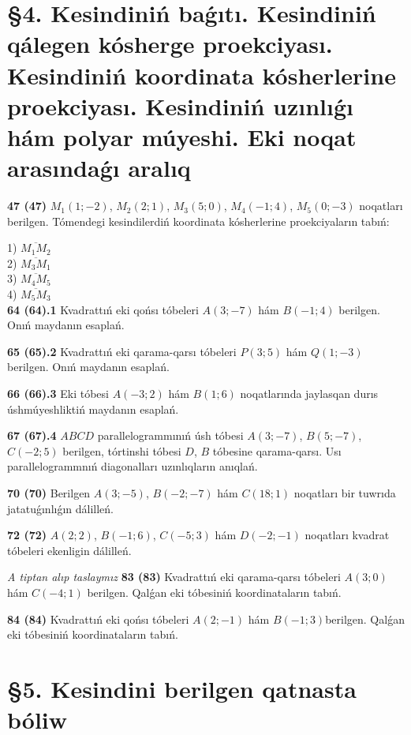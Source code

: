 \documentclass{article}
\begin{document}

\section*{\S 4. Kesindiniń baǵıtı. Kesindiniń qálegen kósherge proekciyası. 
Kesindiniń koordinata kósherlerine proekciyası. 
Kesindiniń uzınlıǵı hám polyar múyeshi. 
Eki noqat arasındaǵı aralıq}

\textbf{47 (47)} $M_1(1; -2)$, $M_2(2; 1)$, $M_3(5; 0)$, 
$M_4(-1; 4)$, $M_5(0; -3)$ noqatları berilgen. 
Tómendegi kesindilerdiń koordinata kósherlerine proekciyaların tabıń:

1) $\overline{M_1M_2}$ \\
2) $\overline{M_3M_1}$ \\
3) $\overline{M_4M_5}$ \\
4) $\overline{M_5M_3}$ \\

\textbf{64 (64).1} Kvadrattıń eki qońsı tóbeleri $A(3; -7)$ hám
$B(-1;4)$ berilgen. Onıń maydanın esaplań.

\textbf{65 (65).2} Kvadrattıń eki qarama-qarsı tóbeleri $P(3; 5)$ hám
$Q(1; -3)$ berilgen. Onıń maydanın esaplań.

\textbf{66 (66).3} Eki tóbesi $A(-3; 2)$ hám $B(1; 6)$ noqatlarında
jaylasqan durıs úshmúyeshliktiń maydanın esaplań.

\textbf{67 (67).4} $ABCD$ parallelogrammınıń úsh tóbesi $A(3; -7)$, 
$B(5; -7)$, $C(-2; 5)$ berilgen, tórtinshi tóbesi $D$, 
$B$ tóbesine qarama-qarsı. Usı parallelogrammnıń diagonalları
uzınlıqların anıqlań.

\textbf{70 (70)} Berilgen $A(3; -5)$, $B(-2; -7)$ hám
$C(18; 1)$ noqatları bir tuwrıda jatatuǵınlıǵın dálilleń.

\textbf{72 (72)} $A(2;2)$, $B(-1;6)$, $C(-5;3)$ hám $D(-2;-1)$
noqatları kvadrat tóbeleri ekenligin dálilleń.

\emph{A tiptan alıp taslaymız}
\textbf{83 (83)} Kvadrattıń eki qarama-qarsı tóbeleri $A(3;0)$ hám
$C(-4;1)$ berilgen. Qalǵan eki tóbesiniń koordinataların tabıń.

\textbf{84 (84)} Kvadrattıń eki qońsı tóbeleri $A(2;-1)$ hám
$B(-1;3)$berilgen. Qalǵan eki tóbesiniń koordinataların tabıń.

\section*{\S 5. Kesindini berilgen qatnasta bóliw}
\end{document}

